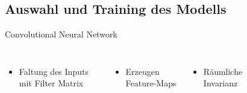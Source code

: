\subsection[\thesection .\thesubsection \ 
Auswahl und Training des Modells]{Auswahl und Training des Modells}\label{subsec:train}


\begin{frame}{Convolutional Neural Network}
    \begin{columns}[T]
        \begin{itemize}
            \item Faltung des Inputs mit Filter Matrix
        \end{itemize}
        \begin{itemize}
            \item Erzeugen Feature-Maps
        \end{itemize}
        \begin{itemize}
            \item Räumliche Invarianz
        \end{itemize}
        \vspace{0.5cm}
        
        \begin{figure}
            \centering
            \def\svgwidth{0.95\columnwidth}
            
        \end{figure}
        
    \end{columns}
\end{frame}
